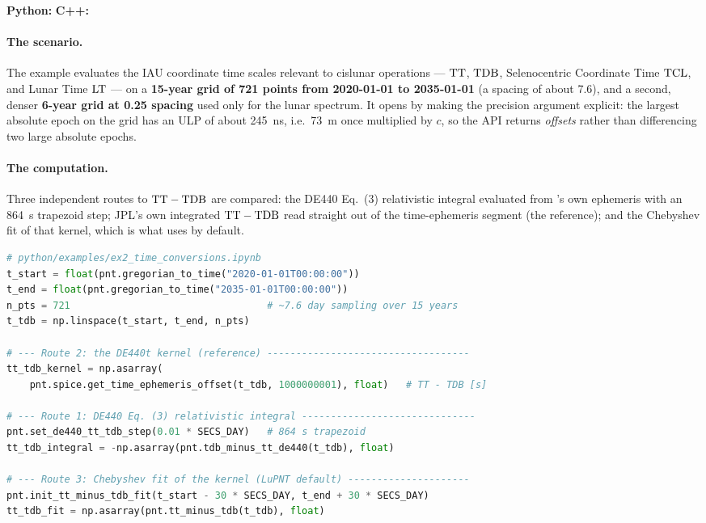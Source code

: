 \textbf{Python:}  \quad
\textbf{C++:} 

\paragraph{The scenario.}
The example evaluates the IAU coordinate time scales relevant to cislunar
operations --- $\mathrm{TT}$, $\mathrm{TDB}$, Selenocentric Coordinate Time $\mathrm{TCL}$, and Lunar
Time $\mathrm{LT}$ --- on a \textbf{15-year grid of 721 points from 2020-01-01 to
2035-01-01} (a spacing of about \SI{7.6}{\dayunit}), and a second, denser
\textbf{6-year grid at \SI{0.25}{\dayunit} spacing} used only for the lunar
spectrum. It opens by making the precision argument explicit: the largest
absolute epoch on the grid has an ULP of about \SI{245}{\nano\second}, i.e.\
\SI{73}{\meter} once multiplied by $c$, so the API returns \emph{offsets} rather
than differencing two large absolute epochs.

\paragraph{The computation.}
Three independent routes to $\mathrm{TT}-\mathrm{TDB}$ are compared: the DE440 Eq.~(3)
relativistic integral evaluated from \lupnt{}'s own ephemeris with an \SI{864}{\second}
trapezoid step; JPL's own integrated $\mathrm{TT}-\mathrm{TDB}$ read straight out of the
\code{de440t} time-ephemeris segment (the reference); and the Chebyshev fit of
that kernel, which is what \lupnt{} uses by default.

\begin{lstlisting}[language=py, caption={Three routes to TT - TDB on the same grid.}, label={lst:tut-ex2-routes}]
# python/examples/ex2_time_conversions.ipynb
t_start = float(pnt.gregorian_to_time("2020-01-01T00:00:00"))
t_end = float(pnt.gregorian_to_time("2035-01-01T00:00:00"))
n_pts = 721                                  # ~7.6 day sampling over 15 years
t_tdb = np.linspace(t_start, t_end, n_pts)

# --- Route 2: the DE440t kernel (reference) -----------------------------------
tt_tdb_kernel = np.asarray(
    pnt.spice.get_time_ephemeris_offset(t_tdb, 1000000001), float)   # TT - TDB [s]

# --- Route 1: DE440 Eq. (3) relativistic integral ------------------------------
pnt.set_de440_tt_tdb_step(0.01 * SECS_DAY)   # 864 s trapezoid
tt_tdb_integral = -np.asarray(pnt.tdb_minus_tt_de440(t_tdb), float)

# --- Route 3: Chebyshev fit of the kernel (LuPNT default) ---------------------
pnt.init_tt_minus_tdb_fit(t_start - 30 * SECS_DAY, t_end + 30 * SECS_DAY)
tt_tdb_fit = np.asarray(pnt.tt_minus_tdb(t_tdb), float)
\end{lstlisting}

